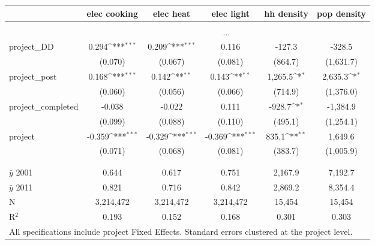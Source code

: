 {\footnotesize
{}  
\def\sym#1{\ifmmode^{#1}\else\(^{#1}\)\fi}
\begin{tabular}{l*{5}{c}}
          &\multicolumn{1}{c}{elec cooking} &\multicolumn{1}{c}{elec heat}  &\multicolumn{1}{c}{elec light}         &\multicolumn{1}{c}{hh density}         &\multicolumn{1}{c}{pop density}    
          \\[0.2em]
\hline\\[-0.9em]
& \multicolumn{5}{c}{...}\\
[.5em]
\rowcolor{o} project\_DD &  0.294\sym{***} &  0.209\sym{***} &  0.116   & -127.3  & -328.5     \\
\rowcolor{o}             &  (0.070)        &  (0.067)        &  (0.081) &(864.7)  &(1,631.7)\\
[.5em]
project\_post & 0.168\sym{***}& 0.142\sym{**} & 0.143\sym{**} &1,265.5\sym{*} &2,635.3\sym{*}  \\
              &  (0.060)       &  (0.056)      &  (0.066)      &(714.9)        &(1,376.0)       \\
[.5em]
project\_completed & -0.038    &   -0.022      &    0.111      & -928.7\sym{*} &-1,384.9  \\
                   & (0.099)   &  (0.088)      &  (0.110)      & (495.1)       &(1,254.1) \\
[.5em]
project     & -0.359\sym{***} & -0.329\sym{***}&-0.369\sym{***}&  835.1\sym{**}&1,649.6         \\
            &  (0.071)        &  (0.068)       &  (0.081)      &(383.7)        &(1,005.9)       \\
          \\[-0.9em]
\hline \\[-0.9em] 
$\bar{y}$ 2001& 0.644      &    0.617       &    0.751       &2,167.9      &7,192.7         \\
$\bar{y}$ 2011& 0.821      &    0.716       &    0.842       &2,869.2      &8,354.4         \\
N          &  3,214,472    &  3,214,472     &  3,214,472     & 15,454        &    15,454         \\
R$^{2}$    & 0.193         &    0.152       &    0.168       &    0.301      &    0.303         \\
\hline
\multicolumn{6}{l}{\tiny All specifications include project Fixed Effects. Standard errors clustered at the project level.}
\end{tabular}
}
